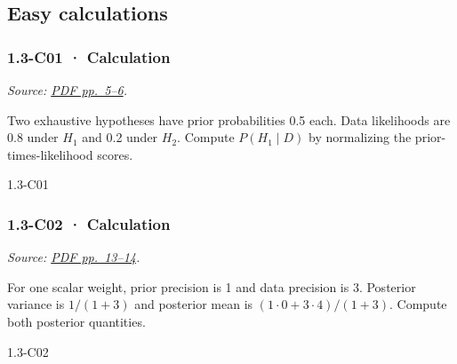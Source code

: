 \subsection{Easy calculations}\label{easy-calculations-2}

\noindent\begin{minipage}{\linewidth}

\subsubsection{1.3-C01 · Calculation}\label{c01-calculation-2}

\emph{Source:
\href{../Lecture\%20Slides/1.3.\%20Bayesian\%20Learning.pdf\#page=5}{PDF
pp.~5--6}.}

Two exhaustive hypotheses have prior probabilities 0.5 each. Data
likelihoods are 0.8 under \(H_1\) and 0.2 under \(H_2\). Compute
\(P(H_1\mid D)\) by normalizing the prior-times-likelihood scores.

\begin{solution}[26mm]{1.3-C01}

\end{solution}
\end{minipage}\par\medskip

\noindent\begin{minipage}{\linewidth}

\subsubsection{1.3-C02 · Calculation}\label{c02-calculation-2}

\emph{Source:
\href{../Lecture\%20Slides/1.3.\%20Bayesian\%20Learning.pdf\#page=13}{PDF
pp.~13--14}.}

For one scalar weight, prior precision is 1 and data precision is 3.
Posterior variance is \(1/(1+3)\) and posterior mean is
\((1\cdot0+3\cdot4)/(1+3)\). Compute both posterior quantities.

\begin{solution}[26mm]{1.3-C02}

\end{solution}
\end{minipage}\par\medskip

